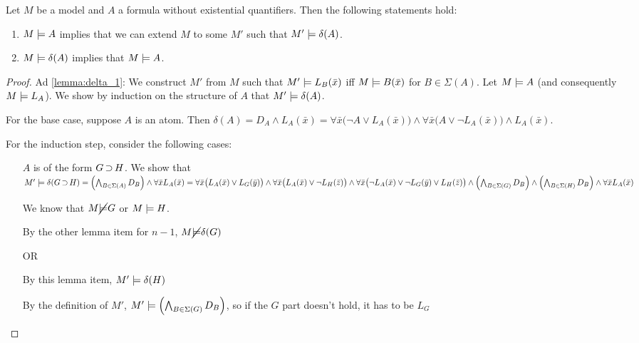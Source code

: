 \begin{lemma}
	Let $M$ be a model and $A$ a formula without existential quantifiers. Then the following statements hold:
	\begin{enumerate}
	\item $M \models A$ implies that we can extend $M$ to some $M'$ such that $M' \models \delta(A)$.
		\label{lemma:delta_1}
	\item $M \models \delta(A)$ implies that $M \models A$.
		\label{lemma:delta_2}
	\end{enumerate}
\end{lemma}
\begin{proof}
	Ad \ref{lemma:delta_1}: 
	We construct $M'$ from $M$ such that $M'\models L_B(\bar x)$ iff $M \models B(\bar x)$ for $B\in\Sigma(A)$.
	Let $M \models A$ (and consequently $M\models L_A$). We show by induction on the structure of $A$ that $M' \models \delta(A)$.

	For the base case, suppose $A$ is an atom. 
	Then $\delta(A) = D_A \land L_A(\bar x) =\allowbreak \forall \bar x \big(\lnot A \lor L_A(\bar x)\big) \land\allowbreak \forall \bar x \big(A \lor \lnot L_A(\bar x)\big) \land L_A(\bar x) $.

	For the induction step, consider the following cases:

	\begin{itemize}
		\item[$A$ is of the form $G \operatorname{\supset} H$.] 
			We show that $M' \models \delta(G\operatorname{\supset} H) = 
			\left(\bigwedge_{B \in \Sigma(A)} D_B\right) \land  \forall \bar x L_A(\bar x) = 
		\forall \bar x \big(L_A(\bar x) \lor L_G(\bar y)\big) \land
		\forall \bar x \big(L_A(\bar x) \lor \lnot L_H(\bar z)\big) \land \forall \bar x \big(\lnot L_A(\bar x) \lor \lnot L_G(\bar y) \lor L_H(\bar z)\big)  
		\land \left(\bigwedge_{B \in \Sigma(G)} D_B\right) 
		\land \left(\bigwedge_{B \in \Sigma(H)} D_B\right) 
		\land \forall \bar x L_A(\bar x)
		$

		We know that $M\cancel{\models} G$ or $M \models H$.

		By the other lemma item for $n-1$, $M \cancel{\models} \delta(G)$

		OR 

		By this lemma item, $M' \models \delta(H)$

		By the definition of $M'$, $M' \models \left(\bigwedge_{B \in \Sigma(G)} D_B\right) $, so if the $G$ part doesn't hold, it has to be $L_G$
	\end{itemize}



\end{proof}

